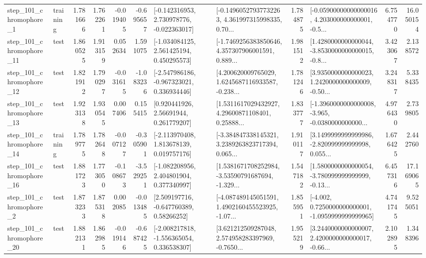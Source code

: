 \begin{tabular}{llrrrrllrlrr}
   step\_101\_chromophore\_1 &  training &      1.781666 &    1.762261 &     -0.019405 & -0.695657 &   [-0.142316953, 2.730978776, -0.022363017] &  [-0.14960527937732263, 4.361997315998335, 0.70... &       1.784875 &  [-0.05900000000000016, 4.203000000000001, -0.5... &            6.754770 &         16.050154 \\
  step\_101\_chromophore\_11 &      test &      1.860525 &    1.913159 &      0.052634 &  1.591075 &    [-1.034084125, 2.561425194, 0.450295573] &  [-1.7469256383850646, 4.357307906001591, 0.889... &       1.981512 &  [1.4280000000000044, -3.8530000000000015, -0.8... &            3.423067 &          2.138572 \\
  step\_101\_chromophore\_12 &      test &      1.821912 &    1.790297 &     -0.031615 & -1.083236 &   [-2.547986186, -0.967323021, 0.336934446] &  [4.200620009765029, 1.6245687116933587, -0.238... &       1.781246 &  [3.9350000000000023, 1.2420000000000009, -0.50... &            3.248317 &          5.338435 \\
  step\_101\_chromophore\_13 &      test &      1.923138 &    1.930545 &      0.007406 &  0.155415 &      [0.920441926, 2.56691944, 0.261779207] &  [1.5311617029432927, 4.29600871108401, 0.25888... &       1.833777 &  [-1.3960000000000008, -3.965, -0.0380000000000... &            4.976430 &          2.739805 \\
  step\_101\_chromophore\_14 &  training &      1.789775 &    1.782648 &     -0.007127 & -0.305901 &    [-2.113970408, 1.813678139, 0.019757176] &  [-3.384847338145321, 3.2389263823717394, 0.065... &       1.910117 &  [3.1499999999999986, -2.820999999999998, 0.055... &            1.676425 &          2.442760 \\
  step\_101\_chromophore\_16 &      test &      1.881723 &    1.773050 &     -0.108673 & -3.529251 &    [-1.082208956, 2.404801904, 0.377340997] &  [1.5381671708252984, -3.53590791687694, -1.329... &       1.547182 &  [1.5800000000000054, -3.780999999999999, -0.13... &            6.457316 &         17.169065 \\
   step\_101\_chromophore\_2 &      test &      1.873233 &    1.875318 &      0.002085 & -0.013485 &     [2.509197716, -0.647760389, 0.58266252] &  [-4.087489145051591, 1.4902160455523925, -1.07... &       1.855951 &  [-4.002, 0.7250000000000001, -1.0959999999999965] &            4.741745 &          9.525051 \\
  step\_101\_chromophore\_20 &      test &      1.882131 &    1.862985 &     -0.019146 & -0.687425 &   [-2.008217818, -1.556365054, 0.336538307] &  [3.621212509287048, 2.574958283397969, -0.7650... &       1.955219 &  [3.2440000000000007, 2.4200000000000017, -0.66... &            2.102895 &          1.348396 \\

\end{tabular}
